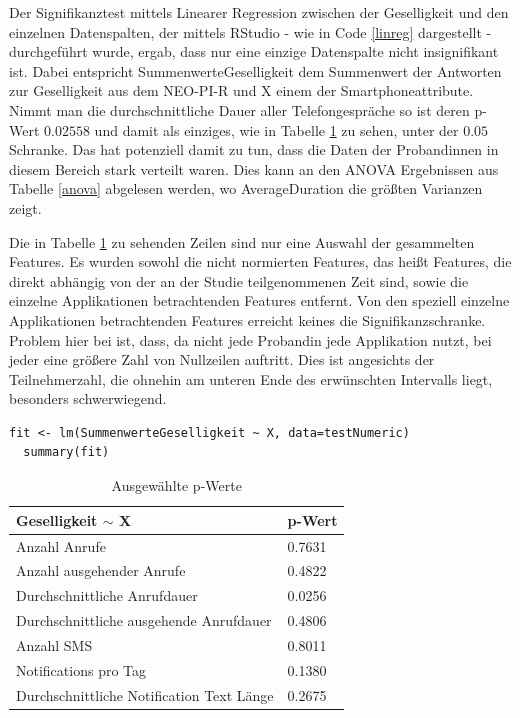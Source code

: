 Der Signifikanztest mittels Linearer Regression zwischen der Geselligkeit und den einzelnen Datenspalten, der mittels RStudio - wie in Code \ref{linreg} dargestellt - durchgeführt wurde, ergab, 
dass nur eine einzige Datenspalte nicht insignifikant ist.
Dabei entspricht SummenwerteGeselligkeit dem Summenwert der Antworten zur Geselligkeit aus dem NEO-PI-R und X einem der Smartphoneattribute.
Nimmt man die durchschnittliche Dauer aller Telefongespräche so ist deren p-Wert $0.02558$ und damit als einziges, wie in Tabelle \ref{pvalues} zu sehen, unter der $0.05$ Schranke.
Das hat potenziell damit zu tun, dass die Daten der Probandinnen in diesem Bereich stark verteilt waren. 
Dies kann an den ANOVA Ergebnissen aus Tabelle \ref{anova} abgelesen werden, wo AverageDuration die größten Varianzen zeigt.

\par
Die in Tabelle \ref{pvalues} zu sehenden Zeilen sind nur eine Auswahl der gesammelten Features.
Es wurden sowohl die nicht normierten Features, das heißt Features, die direkt abhängig von der an der Studie teilgenommenen Zeit sind, sowie die einzelne Applikationen betrachtenden Features entfernt.
Von den speziell einzelne Applikationen betrachtenden Features erreicht keines die Signifikanzschranke.
Problem hier bei ist, dass, da nicht jede Probandin jede Applikation nutzt, bei jeder eine größere Zahl von Nullzeilen auftritt.
Dies ist angesichts der Teilnehmerzahl, die ohnehin am unteren Ende des erwünschten Intervalls liegt, besonders schwerwiegend.


\begin{lstlisting}[frame=single, caption = Lineare Regression, label=linreg] 
  fit <- lm(SummenwerteGeselligkeit ~ X, data=testNumeric)
  summary(fit)
\end{lstlisting}

\begin{table}[]
\centering
\caption{Ausgewählte p-Werte}
\label{pvalues}
\begin{tabular}{@{}ll@{}}
\toprule
Geselligkeit $\sim$ X                     & p-Wert \\ \midrule
Anzahl Anrufe                             & 0.7631 \\
Anzahl ausgehender Anrufe                 & 0.4822 \\
Durchschnittliche Anrufdauer              & 0.0256 \\
Durchschnittliche ausgehende Anrufdauer   & 0.4806 \\
Anzahl SMS                                & 0.8011 \\
Notifications pro Tag                     & 0.1380 \\
Durchschnittliche Notification Text Länge & 0.2675 \\ \bottomrule
\end{tabular}
\end{table}

